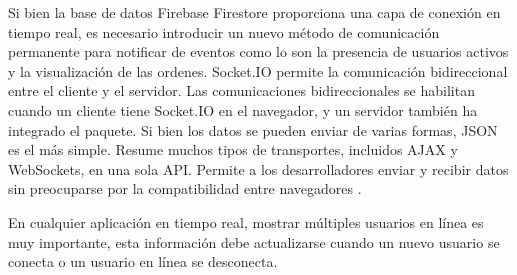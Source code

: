 Si bien la base de datos Firebase Firestore proporciona una capa de conexión en tiempo real, es necesario introducir un nuevo método de comunicación permanente para notificar de eventos como lo son la presencia de usuarios activos y la visualización de las ordenes. Socket.IO permite la comunicación bidireccional entre el cliente y el servidor. Las comunicaciones bidireccionales se habilitan cuando un cliente tiene Socket.IO en el navegador, y un servidor también ha integrado el paquete. Si bien los datos se pueden enviar de varias formas, JSON es el más simple. Resume muchos tipos de transportes, incluidos AJAX y WebSockets, en una sola API. Permite a los desarrolladores enviar y recibir datos sin preocuparse por la compatibilidad entre navegadores \cite{kelleher}.
\vspace{0.8cm}

En cualquier aplicación en tiempo real, mostrar múltiples usuarios en línea es muy importante, esta información debe actualizarse cuando un nuevo usuario se conecta o un usuario en línea se desconecta.
\vspace{0.8cm}

